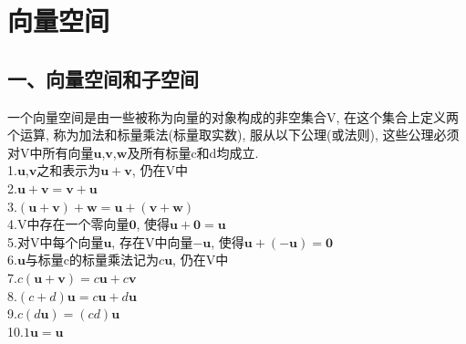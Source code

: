 \chapter{向量空间}
\section{一、向量空间和子空间}
\begin{definition}
一个向量空间是由一些被称为向量的对象构成的非空集合V, 在这个集合上定义两个运算, 称为加法和标量乘法(标量取实数), 服从以下公理(或法则), 这些公理必须对V中所有向量$\mathbf{u}$,$\mathbf{v}$,$\mathbf{w}$及所有标量c和d均成立.\\
1.\quad$\mathbf{u}$,$\mathbf{v}$之和表示为$\mathbf{u}+\mathbf{v}$, 仍在V中\\
2.\quad$\mathbf{u+v=v+u}$\\
3.\quad$\mathbf{(u+v)+w=u+(v+w)}$\\
4.\quad V中存在一个零向量$\mathbf{0}$, 使得$\mathbf{u+0=u}$\\
5.\quad 对V中每个向量$\mathbf{u}$, 存在V中向量$-\mathbf{u}$, 使得$\mathbf{u+(-u)=0}$\\
6.\quad$\mathbf{u}$与标量c的标量乘法记为$c\mathbf{u}$, 仍在V中\\
7.\quad$c\mathbf{(u+v)}=c\mathbf{u}+c\mathbf{v}$\\
8.\quad$(c+d)\mathbf{u}=c\mathbf{u}+d\mathbf{u}$\\
9.\quad$c(d\mathbf{u})=(cd)\mathbf{u}$\\
10.\quad$1\mathbf{u=u}$\\
\end{definition}
